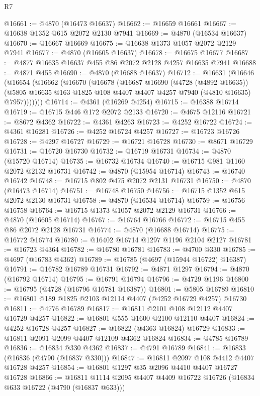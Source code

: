 \begin{lexlean}{R7}
\begin{coremodule}
@16661 := @4870 (@16473 @16637)
@16662 := @16659 @16661
@16667 := @16638 @1352 @615 @2072 @2130 @7941
@16669 := @4870 (@16534 @16637)
@16670 := @16667 @16669
@16675 := @16638 @1373 @1057 @2072 @2129 @7941
@16677 := @4870 (@16605 @16637)
@16678 := @16675 @16677
@16687 := @4877 @16635 @16637 @455 @86 @2072 @2128 @4257 @16635 @7941
@16688 := @4871 @455
@16690 := @4870 (@16688 @16637)
@16712 := @16631
    (@16646
      (@16654
        (@16662
          (@16670
            (@16678
              (@16687
                @16690
                (@4728 (@4892 @16635))
                (@5805 @16635 @163 @1825 @108 @4407 @4407 @4257 @7940 (@4810 @16635) @7957)))))))
@16714 := @4361 (@16269 @4254)
@16715 := @16388 @16714
@16719 := @16715 @446 @172 @2072 @2133
@16720 := @4675 @12116
@16721 := @8672 @4362
@16722 := @4361 @4263
@16723 := @4252 @16722
@16724 := @4361 @16281
@16726 := @4252 @16724 @4257
@16727 := @16723 @16726
@16728 := @4297 @16727
@16729 := @16721 @16728
@16730 := @8671 @16729
@16731 := @16720 @16730
@16732 := @16719 @16731
@16734 := @4870 (@15720 @16714)
@16735 := @16732 @16734
@16740 := @16715 @981 @1160 @2072 @2132 @16731
@16742 := @4870 (@15954 @16714)
@16743 := @16740 @16742
@16748 := @16715 @802 @475 @2072 @2131 @16731
@16750 := @4870 (@16473 @16714)
@16751 := @16748 @16750
@16756 := @16715 @1352 @615 @2072 @2130 @16731
@16758 := @4870 (@16534 @16714)
@16759 := @16756 @16758
@16764 := @16715 @1373 @1057 @2072 @2129 @16731
@16766 := @4870 (@16605 @16714)
@16767 := @16764 @16766
@16772 := @16715 @455 @86 @2072 @2128 @16731
@16774 := @4870 (@16688 @16714)
@16775 := @16772 @16774
@16780 := @16402 @16714 @1297 @1196 @2104 @2127
@16781 := @16723 @4364
@16782 := @16780 @16781
@16783 := @4700 @330
@16785 := @4697 (@16783 @4362)
@16789 := @16785 (@4697 (@15944 @16722) @16387)
@16791 := @16782 @16789 @16731
@16792 := @4871 @1297
@16794 := @4870 (@16792 @16714)
@16795 := @16791 @16794
@16796 := @4729 @1196
@16800 := @16795 (@4728 (@16796 @16781 @16387))
@16801 := @5805 @16789
@16810 := @16801 @189 @1825 @2103 @12114 @4407 (@4252 @16729 @4257) @16730
@16811 := @4776 @16789
@16817 := @16811 @2101 @108 @12112 @4407 @16729 @4257
@16822 := @16801 @555 @1600 @2100 @12110 @4407
@16824 := @4252 @16728 @4257
@16827 := @16822 (@4363 @16824) @16729
@16833 := @16811 @2091 @2099 @4407 @12109 @4362 @16824
@16834 := @4785 @16789
@16836 := @16834 @330 @4362
@16837 := @4791 @16789
@16841 := @16833 (@16836 (@4790 (@16837 @330)))
@16847 := @16811 @2097 @108 @4412 @4407 @16728 @4257
@16854 := @16801 @1297 @35 @2096 @4410 @4407 @16727 @16728
@16866 := @16811 @1114 @2095 @4407 @4409 @16722 @16726 (@16834 @633 @16722 (@4790 (@16837 @633)))

\end{coremodule}
\end{lexlean}
